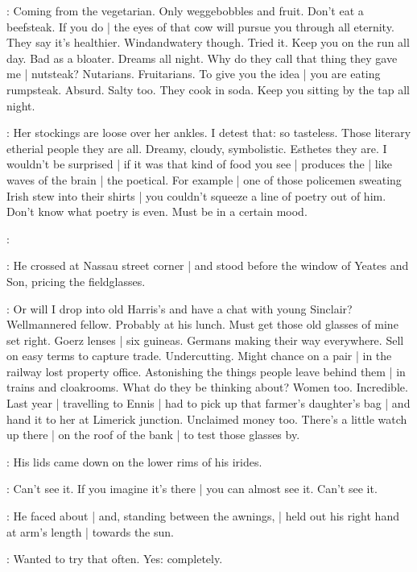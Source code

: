 \BloomInt:
Coming from the vegetarian.
Only weggebobbles and fruit.
Don't eat a beefsteak.
If you do |
the eyes of that cow will pursue you through all eternity.
They say it's healthier.
Windandwatery though.
Tried it.
Keep you on the run all day.
Bad as a bloater.
Dreams all night.
Why do they call that thing they gave me |
nutsteak?
Nutarians.
Fruitarians.
To give you the idea |
you are eating rumpsteak.
Absurd.
Salty too.
They cook in soda.
Keep you sitting by the tap all night.

\BloomInt:
Her stockings are loose over her ankles.
I detest that:
so tasteless.
Those literary etherial people they are all.
Dreamy,
cloudy,
symbolistic.
Esthetes they are.
I wouldn't be surprised |
if it was that kind of food you see |
produces the |
like waves of the brain |
the poetical.
For example |
one of those policemen sweating Irish stew into their shirts |
you couldn't squeeze a line of poetry out of him.
Don't know what poetry is even.
Must be in a certain mood.

\BloomInt:
%

:
He crossed at Nassau street corner |
and stood before the window of Yeates and Son,
pricing the fieldglasses.

\BloomInt:
Or will I drop into old Harris's
and have a chat with young Sinclair?
Wellmannered fellow.
Probably at his lunch.
Must get those old glasses of mine set right.
Goerz lenses |
six guineas.
Germans making their way everywhere.
Sell on easy terms to capture trade.
Undercutting.
Might chance on a pair |
in the railway lost property office.
Astonishing the things people leave behind them |
in trains and cloakrooms.
What do they be thinking about?
Women too.
Incredible.
Last year |
travelling to Ennis |
had to pick up that farmer's daughter's bag |
and hand it to her at Limerick junction.
Unclaimed money too.
There's a little watch up there |
on the roof of the bank |
to test those glasses by.

:
His lids came down on the lower rims of his irides.

\BloomInt:
Can't see it.
If you imagine it's there |
you can almost see it.
Can't see it.

:
He faced about |
and, standing between the awnings, |
held out his right hand at arm's length |
towards the sun.

\BloomInt:
Wanted to try that often.
Yes:
completely.

